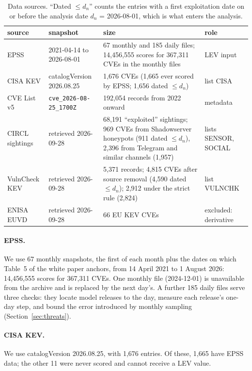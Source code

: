\begin{table}[t]
\centering\small
\caption{Data sources. ``Dated $\le d_n$'' counts the entries with a first
exploitation date on or before the analysis date $d_n$ = 2026-08-01, which is
what enters the analysis.}\label{tab:data}
\begin{tabularx}{\linewidth}{@{}p{2.1cm}p{3.6cm}Xp{2.6cm}@{}}
\toprule
source & snapshot & size & role \\
\midrule
EPSS & 2021-04-14 to 2026-08-01 & 67 monthly and 185 daily files; 14,456,555 scores for 367,311 CVEs in the monthly files & LEV input \\
CISA KEV & catalogVersion 2026.08.25 & 1,676 CVEs (1,665 ever scored by EPSS; 1,656 dated $\le d_n$) & list CISA \\
CVE List v5 & \texttt{cve\_2026-08-25\_1700Z} & 192,054 records from 2022 onward & metadata \\
CIRCL sightings & retrieved 2026-09-28 & 68,191 ``exploited'' sightings; 969 CVEs from Shadowserver honeypots (911 dated $\le d_n$), 2,396 from Telegram and similar channels (1,957) & lists SENSOR, SOCIAL \\
VulnCheck KEV & retrieved 2026-09-28 & 5,371 records; 4,815 CVEs after source removal (4,590 dated $\le d_n$); 2,912 under the strict rule (2,824) & list VULNCHK \\
ENISA EUVD & retrieved 2026-09-28 & 66 EU KEV CVEs & excluded: derivative \\
\bottomrule
\end{tabularx}
\end{table}

\paragraph{EPSS.} We use 67 monthly snapshots, the first of each month plus the
dates on which Table~5 of the white paper anchors, from 14 April 2021 to
1 August 2026: 14,456,555 scores for 367,311 CVEs. One monthly file
(2024-12-01) is unavailable from the archive and is replaced by the next day's.
A further 185 daily files serve three checks: they locate model releases to the
day, measure each release's one-day step, and bound the error introduced by
monthly sampling (Section~\ref{sec:threats}).

\paragraph{CISA KEV.} We use catalogVersion 2026.08.25, with 1,676 entries.
Of these, 1,665 have EPSS data; the other 11 were never scored and cannot
receive a LEV value.


